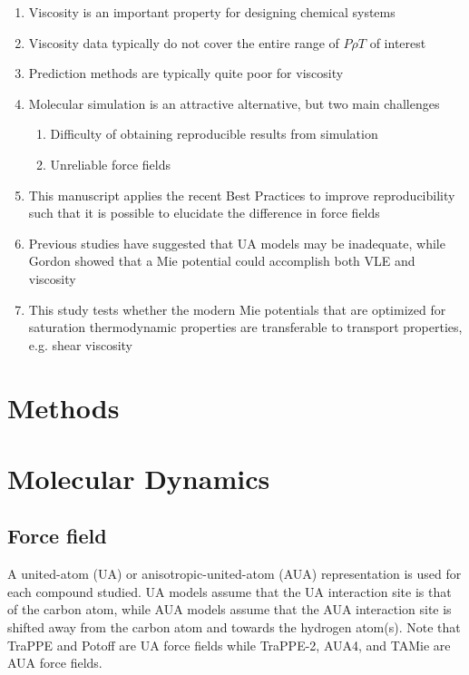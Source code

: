 \documentclass[preprint,review,12pt]{elsarticle}
\begin{document}
\begin{enumerate}
	\item Viscosity is an important property for designing chemical systems
	\item Viscosity data typically do not cover the entire range of $P \rho T$ of interest
	\item Prediction methods are typically quite poor for viscosity
	\item Molecular simulation is an attractive alternative, but two main challenges
	\begin{enumerate}
		\item Difficulty of obtaining reproducible results from simulation
		\item Unreliable force fields
	\end{enumerate}
    \item This manuscript applies the recent Best Practices to improve reproducibility such that it is possible to elucidate the difference in force fields
    \item Previous studies have suggested that UA models may be inadequate, while Gordon showed that a Mie potential could accomplish both VLE and viscosity
    \item This study tests whether the modern Mie potentials that are optimized for saturation thermodynamic properties are transferable to transport properties, e.g. shear viscosity
\end{enumerate}

\section{Methods}

\section{Molecular Dynamics} \label{Methods I}

\subsection{Force field} \label{Force Field}

A united-atom (UA) or anisotropic-united-atom (AUA) representation is used for each compound studied. UA models assume that the UA interaction site is that of the carbon atom, while AUA models assume that the AUA interaction site is shifted away from the carbon atom and towards the hydrogen atom(s). Note that TraPPE and Potoff are UA force fields while TraPPE-2, AUA4, and TAMie are AUA force fields.
\end{document}
